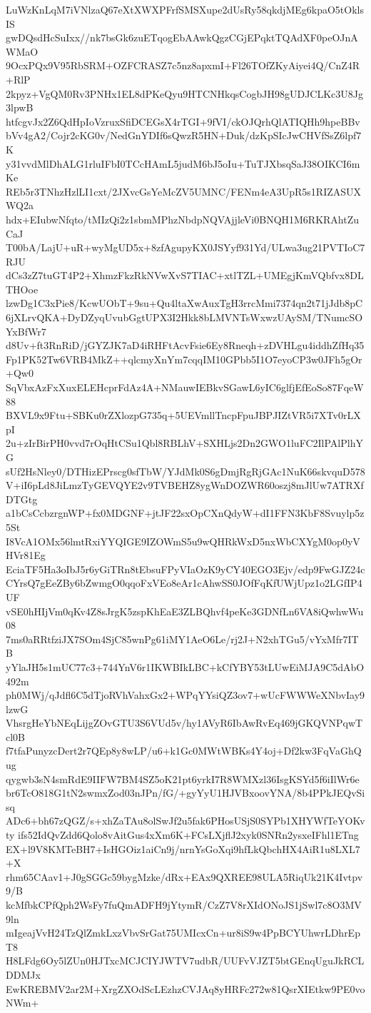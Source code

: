 LuWzKnLqM7iVNlzaQ67eXtXWXPFrfSMSXupe2dUsRy58qkdjMEg6kpaO5tOklsIS
gwDQsdHcSuIxx//nk7bsGk6zuETqogEbAAwkQgzCGjEPqktTQAdXF0peOJnAWMaO
9OcxPQx9V95RbSRM+OZFCRASZ7c5nz8apxmI+Fl26TOfZKyAiyei4Q/CnZ4R+RlP
2kpyz+VgQM0Rv3PNHx1EL8dPKeQyu9HTCNHkqsCogbJH98gUDJCLKc3U8Jg3lpwB
htfcgvJx2Z6QdHpIoVzruxSfiDCEGsX4rTGI+9fVI/ckOJQrhQlATIQHh9hpeBBv
bVv4gA2/Cojr2cKG0v/NedGnYDIf6sQwzR5HN+Duk/dzKpSIcJwCHVfSsZ6lpf7K
y31vvdMlDhALG1rluIFbI0TCcHAmL5judM6bJ5oIu+TuTJXbsqSaJ38OIKCI6mKe
REb5r3TNhzHzlLI1cxt/2JXvcGsYeMcZV5UMNC/FENm4eA3UpR5s1RIZASUXWQ2a
hdx+EIubwNfqto/tMIzQi2z1sbmMPhzNbdpNQVAjjleVi0BNQH1M6RKRAhtZuCaJ
T00bA/LajU+uR+wyMgUD5x+8zfAgupyKX0JSYyf931Yd/ULwa3ug21PVTIoC7RJU
dCs3zZ7tuGT4P2+XhmzFkzRkNVwXvS7TIAC+xtlTZL+UMEgjKmVQbfvx8DLTHOoe
lzwDg1C3xPie8/KcwUObT+9su+Qu4ltaXwAuxTgH3rrcMmi7374qn2t71jJdb8pC
6jXLrvQKA+DyDZyqUvubGgtUPX3I2Hkk8bLMVNTsWxwzUAySM/TNumcSOYxBfWr7
d8Uv+ft3RnRiD/jGYZJK7aD4iRHFtAcvFsie6Ey8Rneqh+zDVHLgu4iddhZfHq35
Fp1PK52Tw6VRB4MkZ++qlcmyXnYm7cqqIM10GPbb5I1O7eyoCP3w0JFh5gOr+Qw0
SqVbxAzFxXuxELEHcprFdAz4A+NMauwIEBkvSGawL6yIC6glfjEfEoSo87FqeW88
BXVL9x9Ftu+SBKu0rZXlozpG735q+5UEVmllTncpFpuJBPJIZtVR5i7XTv0rLXpI
2u+zIrBirPH0vvd7rOqHtCSu1Qbl8RBLhV+SXHLjs2Dn2GWO1luFC2IlPAlPlhYG
sUf2HsNley0/DTHizEPrscg0sfTbW/YJdMk0S6gDmjRgRjGAc1NuK66skvquD578
V+iI6pLd8JiLmzTyGEVQYE2v9TVBEHZ8ygWnDOZWR60oszj8mJlUw7ATRXfDTGtg
a1bCsCcbzrgnWP+fx0MDGNF+jtJF22sxOpCXnQdyW+dI1FFN3KbF8Svuylp5z5St
I8VcA1OMx56lmtRxiYYQIGE9IZOWmS5u9wQHRkWxD5nxWbCXYgM0op0yVHVr81Eg
EciaTF5Ha3oIbJ5r6yGiTRn8tEbsuFPyVIaOzK9yCY40EGO3Ejv/edp9FwGJZ24c
CYrsQ7gEeZBy6bZwmgO0qqoFxVEo8eAr1cAhwSS0JOfFqKfUWjUpz1o2LGfIP4UF
vSE0hHIjVm0qKv4Z8sJrgK5zspKhEaE3ZLBQhvf4peKe3GDNfLn6VA8iQwhwWu08
7ms0aRRtfziJX7SOm4SjC85wnPg61iMY1AeO6Le/rj2J+N2xhTGu5/vYxMfr7ITB
yYlaJH5s1mUC77c3+744YnV6r1IKWBIkLBC+kCfYBY53tLUwEiMJA9C5dAbO492m
ph0MWj/qJdfl6C5dTjoRVhVahxGx2+WPqYYsiQZ3ov7+wUcFWWWeXNbvIay9lzwG
VhsrgHeYbNEqLijgZOvGTU3S6VUd5v/hy1AVyR6IbAwRvEq469jGKQVNPqwTcl0B
f7tfaPunyzcDert2r7QEp8y8wLP/u6+k1Gc0MWtWBKs4Y4oj+Df2kw3FqVaGhQug
qygwb3sN4smRdE9IIFW7BM4SZ5oK21pt6yrkI7R8WMXzl36IsgKSYd5f6iIlWr6e
br6TcO818G1tN2swmxZod03nJPn/fG/+gyYyU1HJVBxoovYNA/8b4PPkJEQvSisq
ADc6+bh67zQGZ/s+xhZaTAu8olSwJf2u5fak6PHosUSjS0SYPb1XHYWfTeYOKvty
ifs52IdQvZdd6Qolo8vAitGus4xXm6K+FCsLXjflJ2xyk0SNRn2ysxeIFhl1ETng
EX+l9V8KMTeBH7+IsHGOiz1aiCn9j/nrnYsGoXqi9hfLkQbchHX4AiR1u8LXL7+X
rhm65CAav1+J0gSGGc59bygMzke/dRx+EAx9QXREE98ULA5RiqUk21K4Ivtpv9/B
kcMfbkCPfQph2WsFy7fuQmADFH9jYtymR/CzZ7V8rXIdONoJS1jSwl7c8O3MV9ln
mIgeajVvH24TzQlZmkLxzVbvSrGat75UMIcxCn+ur8iS9w4PpBCYUhwrLDhrEpT8
H8LFdg6Oy5lZUn0HJTxcMCJCIYJWTV7udbR/UUFvVJZT5btGEnqUguJkRCLDDMJx
EwKREBMV2ar2M+XrgZXOdScLEzhzCVJAq8yHRFc272w81QsrXIEtkw9PE0voNWm+

